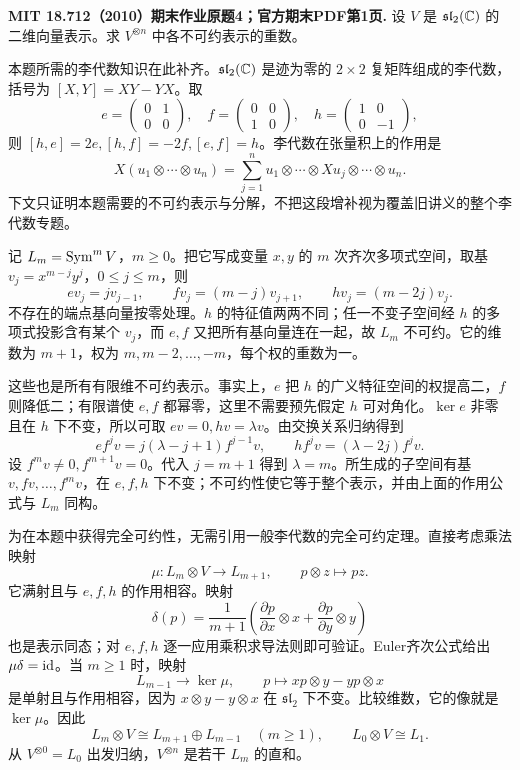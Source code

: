 \begin{exercise}\label{final:4}
\textbf{MIT 18.712（2010）期末作业原题4；官方期末PDF第1页.}
设 $V$ 是 $\mathfrak{sl}_2(\mathbb C)$ 的二维向量表示。求 $V^{\otimes n}$ 中各不可约表示的重数。
\end{exercise}
\begin{solution}
本题所需的李代数知识在此补齐。$\mathfrak{sl}_2(\mathbb C)$ 是迹为零的 $2\times2$ 复矩阵组成的李代数，括号为 $[X,Y]=XY-YX$。取
\[
 e=\begin{pmatrix}0&1\\0&0\end{pmatrix},\quad
 f=\begin{pmatrix}0&0\\1&0\end{pmatrix},\quad
 h=\begin{pmatrix}1&0\\0&-1\end{pmatrix},
\]
则 $[h,e]=2e,[h,f]=-2f,[e,f]=h$。李代数在张量积上的作用是
\[
 X(u_1\otimes\cdots\otimes u_n)
 =\sum_{j=1}^n u_1\otimes\cdots\otimes Xu_j\otimes\cdots\otimes u_n.
\]
下文只证明本题需要的不可约表示与分解，不把这段增补视为覆盖旧讲义的整个李代数专题。

记 $L_m=\operatorname{Sym}^m V$，$m\ge0$。把它写成变量 $x,y$ 的 $m$ 次齐次多项式空间，取基 $v_j=x^{m-j}y^j$，$0\le j\le m$，则
\[
 ev_j=jv_{j-1},\qquad fv_j=(m-j)v_{j+1},\qquad hv_j=(m-2j)v_j.
\]
不存在的端点基向量按零处理。$h$ 的特征值两两不同；任一不变子空间经 $h$ 的多项式投影含有某个 $v_j$，而 $e,f$ 又把所有基向量连在一起，故 $L_m$ 不可约。它的维数为 $m+1$，权为 $m,m-2,\ldots,-m$，每个权的重数为一。

这些也是所有有限维不可约表示。事实上，$e$ 把 $h$ 的广义特征空间的权提高二，$f$ 则降低二；有限谱使 $e,f$ 都幂零，这里不需要预先假定 $h$ 可对角化。$\ker e$ 非零且在 $h$ 下不变，所以可取 $ev=0,hv=\lambda v$。由交换关系归纳得到
\[
 e f^jv=j(\lambda-j+1)f^{j-1}v,\qquad
 h f^jv=(\lambda-2j)f^jv.
\]
设 $f^m v\ne0,f^{m+1}v=0$。代入 $j=m+1$ 得到 $\lambda=m$。所生成的子空间有基 $v,fv,\ldots,f^mv$，在 $e,f,h$ 下不变；不可约性使它等于整个表示，并由上面的作用公式与 $L_m$ 同构。

为在本题中获得完全可约性，无需引用一般李代数的完全可约定理。直接考虑乘法映射
\[
 \mu:L_m\otimes V\longrightarrow L_{m+1},\qquad p\otimes z\longmapsto pz.
\]
它满射且与 $e,f,h$ 的作用相容。映射
\[
 \delta(p)=\frac1{m+1}\left(\frac{\partial p}{\partial x}\otimes x+
               \frac{\partial p}{\partial y}\otimes y\right)
\]
也是表示同态；对 $e,f,h$ 逐一应用乘积求导法则即可验证。Euler齐次公式给出 $\mu\delta=\operatorname{id}$。当 $m\ge1$ 时，映射
\[
 L_{m-1}\longrightarrow\ker\mu,\qquad
 p\longmapsto xp\otimes y-yp\otimes x
\]
是单射且与作用相容，因为 $x\otimes y-y\otimes x$ 在 $\mathfrak{sl}_2$ 下不变。比较维数，它的像就是 $\ker\mu$。因此
\[
 L_m\otimes V\cong L_{m+1}\oplus L_{m-1}\quad(m\ge1),
 \qquad L_0\otimes V\cong L_1.
\]
从 $V^{\otimes0}=L_0$ 出发归纳，$V^{\otimes n}$ 是若干 $L_m$ 的直和。


\end{solution}
